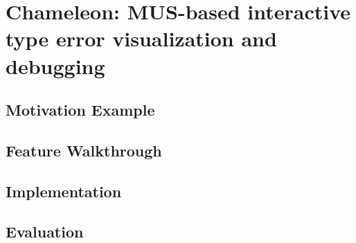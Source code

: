 
\chapter{Chameleon: MUS-based interactive type error visualization and debugging}
\label{chapter3} 


\section{Motivation Example}

\section{Feature Walkthrough}

\section{Implementation}

\section{Evaluation}
